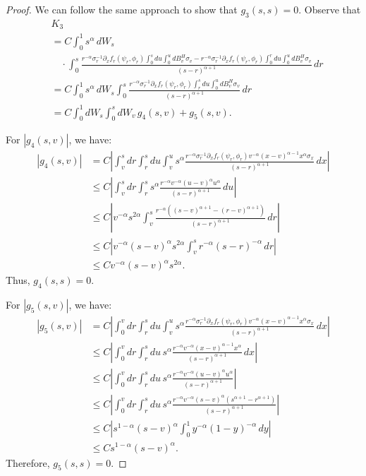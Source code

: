\documentclass[10pt,a4paper]{amsart}
\begin{document}
\begin{proof}
We can follow the same approach to show that \( g_3(s, s) = 0 \). Observe that
\begin{align*}
    &K_3 \\
    &= C \int_0^1 s^\alpha \, dW_s\\
&\quad\cdot\int_0^s \frac{r^{-\alpha} \sigma_r^{-1} \partial_x f_r(\psi_r, \phi_r) \int_0^s du \int_0^u dB^H_v \sigma_v - r^{-\alpha} \sigma_r^{-1} \partial_x f_r(\psi_r, \phi_r) \int_0^r du \int_0^u dB^H_v \sigma_v}{(s - r)^{\alpha + 1}} \, dr \\
    &= C \int_0^1 s^\alpha \, dW_s \int_0^s \frac{r^{-\alpha} \sigma_r^{-1} \partial_x f_r(\psi_r, \phi_r) \int_r^s du \int_0^u dB^H_v \sigma_v}{(s - r)^{\alpha + 1}} \, dr \\
    &= C \int_0^1 dW_s \int_0^s dW_v \, g_4(s,v) + g_5(s,v).
\end{align*}

For \( |g_4(s,v)| \), we have:
\begin{align*}
    |g_4(s,v)| &= C \left| \int_v^s dr \int_r^s du \int_v^u s^\alpha \frac{r^{-\alpha} \sigma_r^{-1} \partial_x f_r(\psi_r, \phi_r) v^{-\alpha} (x - v)^{\alpha - 1} x^\alpha \sigma_x}{(s - r)^{\alpha + 1}} \, dx \right| \\
    &\leq C \left| \int_v^s dr \int_r^s s^\alpha \frac{r^{-\alpha} v^{-\alpha} (u - v)^{\alpha} u^\alpha}{(s - r)^{\alpha + 1}} \, du \right| \\
    &\leq C \left| v^{-\alpha} s^{2\alpha} \int_v^s \frac{r^{-\alpha} \left( (s - v)^{\alpha + 1} - (r - v)^{\alpha + 1} \right)}{(s - r)^{\alpha + 1}} \, dr \right| \\
    &\leq C \left| v^{-\alpha} (s - v)^{\alpha} s^{2\alpha} \int_v^s r^{-\alpha} (s - r)^{-\alpha} \, dr \right| \\
    &\leq C v^{-\alpha} (s - v)^\alpha s^{2\alpha}.
\end{align*}
Thus, \( g_4(s,s) = 0 \).

For \( |g_5(s,v)| \), we have:
\begin{align*}
    |g_5(s,v)| &= C \left| \int_0^v dr \int_r^s du \int_v^u s^\alpha \frac{r^{-\alpha} \sigma_r^{-1} \partial_x f_r(\psi_r, \phi_r) v^{-\alpha} (x - v)^{\alpha - 1} x^\alpha \sigma_x}{(s - r)^{\alpha + 1}} \, dx \right| \\
    &\leq C \left| \int_0^v dr \int_r^s du \, s^\alpha \frac{r^{-\alpha} v^{-\alpha} (x - v)^{\alpha - 1} x^\alpha}{(s - r)^{\alpha + 1}} \, dx \right| \\
    &\leq C \left| \int_0^v dr \int_r^s du \, s^\alpha \frac{r^{-\alpha} v^{-\alpha} (u - v)^\alpha u^\alpha}{(s - r)^{\alpha + 1}} \right| \\
    &\leq C \left| \int_0^v dr \int_r^s du \, s^\alpha \frac{r^{-\alpha} v^{-\alpha} (s - v)^\alpha (s^{\alpha + 1} - r^{\alpha + 1})}{(s - r)^{\alpha + 1}} \right| \\
    &\leq C \left| s^{1-\alpha} (s - v)^\alpha \int_0^1 y^{-\alpha} (1 - y)^{-\alpha} \, dy \right| \\
    &\leq C s^{1-\alpha} (s - v)^\alpha.
\end{align*}
Therefore, \( g_5(s,s) = 0 \).


\end{proof}
\end{document}
